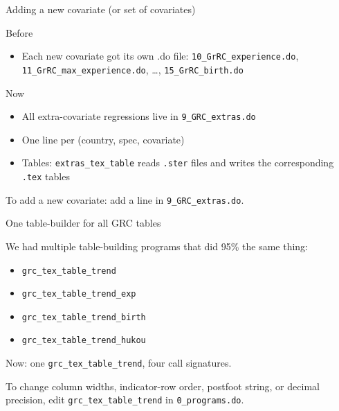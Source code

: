 \documentclass[10pt,aspectratio=169]{beamer}
\newcommand{\code}[1]{\texttt{\small #1}}
\begin{document}
\begin{frame}{Adding a new covariate (or set of covariates)}

\textcolor{cktgray}{Before}
\begin{itemize}\setlength\itemsep{2pt}
    \item Each new covariate got its own .do file: \code{10\_GrRC\_experience.do}, \code{11\_GrRC\_max\_experience.do}, \dots, \code{15\_GrRC\_birth.do}
\end{itemize}

\medskip
\textcolor{cktblue}{Now}
\begin{itemize}\setlength\itemsep{2pt}
    \item All extra-covariate regressions live in \code{9\_GRC\_extras.do}
    \item One line per (country, spec, covariate)
    \item Tables: \code{extras\_tex\_table} reads \code{.ster} files and writes the corresponding \code{.tex} tables
\end{itemize}

\medskip
\textcolor{cktblue}{To add a new covariate}: add a line in \code{9\_GRC\_extras.do}.

\end{frame}

\begin{frame}{One table-builder for all GRC tables}

We had multiple table-building programs that did 95\% the same thing:

\medskip
\begin{itemize}\setlength\itemsep{2pt}
    \item \code{grc\_tex\_table\_trend}
    \item \code{grc\_tex\_table\_trend\_exp}
    \item \code{grc\_tex\_table\_trend\_birth}
    \item \code{grc\_tex\_table\_trend\_hukou}
\end{itemize}

\medskip
Now: one \code{grc\_tex\_table\_trend}, four call signatures.

\bigskip
\textcolor{cktblue}{To change column widths, indicator-row order, postfoot string, or decimal precision}, edit \code{grc\_tex\_table\_trend} in \code{0\_programs.do}.

\end{frame}
\end{document}
